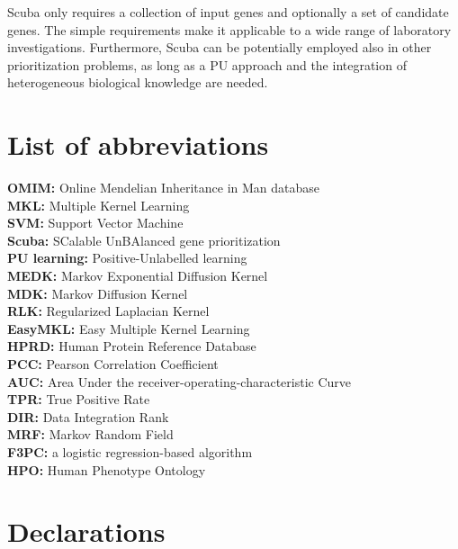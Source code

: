 \documentclass[twocolumn]{bmcart}%
\begin{document}
Scuba only requires a collection of input genes and optionally a set of candidate genes. The simple requirements make it applicable to a wide range of laboratory investigations. Furthermore, Scuba can be potentially employed also in other prioritization problems, as long as a PU approach and the integration of heterogeneous biological knowledge are needed.






\begin{backmatter}

\section*{List of abbreviations}
\textbf{OMIM:} Online Mendelian Inheritance in Man database\\
\textbf{MKL:} Multiple Kernel Learning\\
\textbf{SVM:} Support Vector Machine\\
\textbf{Scuba:} SCalable UnBAlanced gene prioritization\\
\textbf{PU learning:} Positive-Unlabelled learning\\
\textbf{MEDK:} Markov Exponential Diffusion Kernel\\
\textbf{MDK:} Markov Diffusion Kernel\\
\textbf{RLK:} Regularized Laplacian Kernel\\
\textbf{EasyMKL:} Easy Multiple Kernel Learning\\
\textbf{HPRD:} Human Protein Reference Database\\
\textbf{PCC:} Pearson Correlation Coefficient\\
\textbf{AUC:} Area Under the receiver-operating-characteristic Curve\\
\textbf{TPR:} True Positive Rate\\
\textbf{DIR:} Data Integration Rank\\
\textbf{MRF:} Markov Random Field\\
\textbf{F3PC:} a logistic regression-based algorithm\\
\textbf{HPO:} Human Phenotype Ontology


\section*{Declarations}


\end{backmatter}
\end{document}
